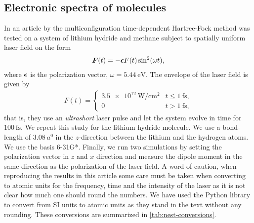         \subsection{Electronic spectra of molecules}
            In an article by \citeauthor{nest} \cite{nest} the
            multiconfiguration time-dependent Hartree-Fock method was tested on
            a system of lithium hydride and methane subject to spatially uniform
            laser field on the form
            \begin{align}
                \boldsymbol{F}(t)
                = -\boldsymbol{\epsilon}
                F(t) \sin^2(\omega t),
            \end{align}
            where $\boldsymbol{\epsilon}$ is the polarization vector, $\omega =
            \SI{5.44}{\electronvolt}$.
            The envelope of the laser field is given by
            \begin{align}
                F(t) = \begin{cases}
                    \SI{3.5e12}{\watt/\cm^2}
                    & t \leq \SI{1}{\femto\second}, \\
                    0 & t > \SI{1}{\femto\second},
                \end{cases}
            \end{align}
            that is, they use an \emph{ultrashort} laser pulse and let the
            system evolve in time for $\SI{100}{\femto\second}$.
            We repeat this study for the lithium hydride molecule.
            We use a bond-length of $\SI{3.08}{\bohr}$ in the $z$-direction
            between the lithium and the hydrogen atoms.
            We use the basis 6-31G*.
            Finally, we run two simulations by setting the polarization vector
            in $z$ and $x$ direction and measure the dipole moment in the same
            direction as the polarization of the laser field.
            A word of caution, when reproducing the results in this article some
            care must be taken when converting to atomic units for the
            frequency, time and the intensity of the laser as it is not clear
            how much one should round the numbers.
            We have used the Python library  \cite{pint} to
            convert from SI units to atomic units as they stand in the text
            without any rounding.
            These conversions are summarized in \autoref{tab:nest-conversions}.
